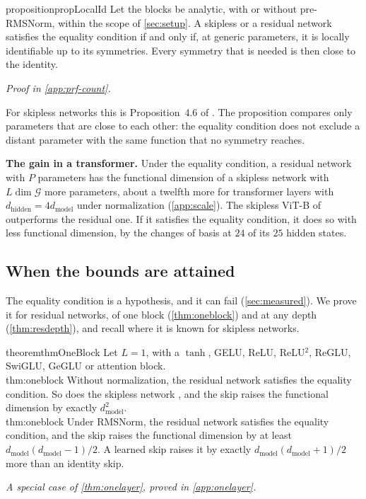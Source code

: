 \documentclass[10pt]{article}
\theoremstyle{definition}
\theoremstyle{remark}
\newcommand{\dm}{d_{\mathrm{model}}}
\newcommand{\dhid}{d_{\mathrm{hidden}}}
\newcommand{\G}{\mathcal{G}}
\newcommand{\para}[1]{\smallskip\noindent\textbf{#1}\hspace{0.5em}}
\newcommand{\ptlabel}[1]{\phantomsection\label{#1}}
\newcommand{\proofin}[1]{\par\vspace{-0.4\baselineskip}\noindent\hfill{\small\itshape Proof in \cref{#1}.}\par\smallskip}
\newcommand{\specialof}[2]{\par\vspace{-0.4\baselineskip}\noindent\hfill{\small\itshape A special case of \cref{#1}, proved in \cref{#2}.}\par\smallskip}
\newcommand{\stpart}[3]{\ifx\relax#1\relax\else\ptlabel{#1:#2}\fi{\upshape\bfseries\boldmath(#2)\ifx\relax#3\relax\else\ #3.\fi}}
\newcommand{\KDlocalid}{4.6}  %
\newcommand{\KDoneblock}{5.1} %
\begin{document}
\begin{restatable}{proposition}{propLocalId}\label{prop:localid}
Let the blocks be analytic, with or without pre-RMSNorm, within the scope of \cref{sec:setup}. A skipless or a residual network satisfies the equality condition if and only if, at generic parameters, it is locally identifiable up to its symmetries. Every symmetry that is needed is then close to the identity.
\end{restatable}
\proofin{app:prf-count}

For skipless networks this is Proposition~\KDlocalid{} of \citet{karbevski2026dimension}. The proposition compares only parameters that are close to each other: the equality condition does not exclude a distant parameter with the same function that no symmetry reaches.

\para{The gain in a transformer.} Under the equality condition, a residual network with $P$ parameters has the functional dimension of a skipless network with $L\dim\G$ more parameters, about a twelfth more for transformer layers with $\dhid = 4\dm$ under normalization (\cref{app:scale}). The skipless ViT-B of \citet{ji2026cutting} outperforms the residual one. If it satisfies the equality condition, it does so with less functional dimension, by the changes of basis at $24$ of its $25$ hidden states.

\subsection{When the bounds are attained}\label{sec:onelayer}

The equality condition is a hypothesis, and it can fail (\cref{sec:measured}). We prove it for residual networks, of one block (\cref{thm:oneblock}) and at any depth (\cref{thm:resdepth}), and recall where it is known for skipless networks.

\begin{restatable}{theorem}{thmOneBlock}\label{thm:oneblock}
Let $L = 1$, with a $\tanh$, GELU, ReLU, ReLU$^2$, ReGLU, SwiGLU, GeGLU or attention block.\\
\stpart{thm:oneblock}{i}{} Without normalization, the residual network satisfies the equality condition. So does the skipless network \citep[Theorem~\KDoneblock]{karbevski2026dimension}, and the skip raises the functional dimension by exactly $\dm^2$.\\
\stpart{thm:oneblock}{ii}{} Under RMSNorm, the residual network satisfies the equality condition, and the skip raises the functional dimension by at least $\dm(\dm-1)/2$. A learned skip raises it by exactly $\dm(\dm+1)/2$ more than an identity skip.
\end{restatable}
\specialof{thm:onelayer}{app:onelayer}
\end{document}
